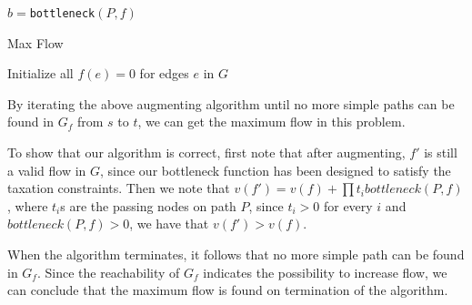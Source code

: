 \begin{exercise}[]
\begin{solution}
\begin{algorithm}[H]
    $b=$\texttt{bottleneck}$(P,f)$\;
  \end{algorithm}

  \begin{algorithm}[H]

    \BlankLine
    \caption{Max Flow}\label{Alg_flow}
    Initialize all $f(e) = 0$ for edges $e$ in $G$ \;
  \end{algorithm}
  By iterating the above augmenting algorithm until no more simple paths can be found in $G_f$ from $s$ to $t$, we can get the maximum flow in this problem.

  To show that our algorithm is correct, first note that after augmenting, $f'$ is still a valid flow in $G$, since our bottleneck function has been designed to satisfy the taxation constraints. Then we note that $v(f') = v(f) + \prod t_i bottleneck(P,f)$, where $t_i$s are the passing nodes on path $P$, since $t_i > 0$ for every $i$ and $bottleneck(P,f)>0$, we have that $v(f')>v(f)$.
  
  When the algorithm terminates, it follows that no more simple path can be found in $G_f$. Since the reachability of $G_f$ indicates the possibility to increase flow, we can conclude that the maximum flow is found on termination of the algorithm.
  \end{solution}
  \label{ex4}
\end{exercise}